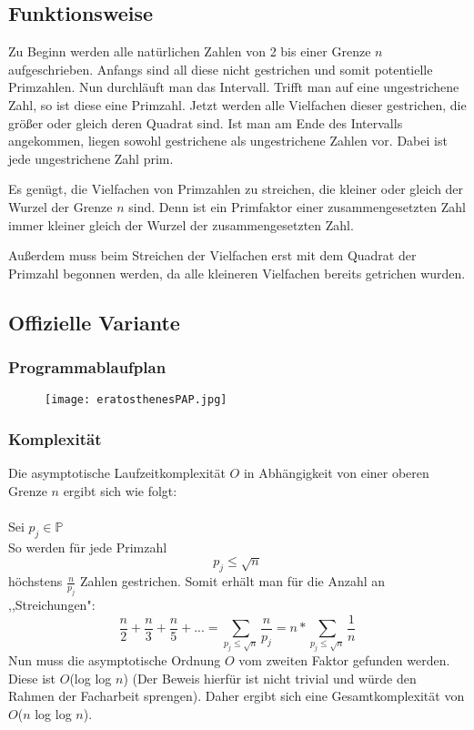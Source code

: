 \documentclass[a4paper,12pt]{article}
\begin{document}
\subsection{Funktionsweise}
Zu Beginn werden alle natürlichen Zahlen von 2 bis einer Grenze $n$ aufgeschrieben. Anfangs sind all diese nicht gestrichen und somit potentielle Primzahlen. Nun durchläuft man das Intervall. Trifft man auf eine ungestrichene Zahl, so ist diese eine Primzahl. Jetzt werden alle Vielfachen dieser gestrichen, die größer oder gleich deren Quadrat sind. Ist man am Ende des Intervalls angekommen, liegen sowohl gestrichene als ungestrichene Zahlen vor. Dabei ist jede ungestrichene Zahl prim.

Es genügt, die Vielfachen von Primzahlen zu streichen, die kleiner oder gleich der Wurzel der Grenze $n$ sind. Denn ist ein Primfaktor einer zusammengesetzten Zahl immer kleiner gleich der Wurzel der zusammengesetzten Zahl.

Außerdem muss beim Streichen der Vielfachen erst mit dem Quadrat der Primzahl begonnen werden, da alle kleineren Vielfachen bereits getrichen wurden.

\newpage{}

\subsection{Offizielle Variante}

\subsubsection{Programmablaufplan}
\begin{figure}[h]
\texttt{[image: eratosthenesPAP.jpg]}
\end{figure}

\subsubsection{Komplexität}
Die asymptotische Laufzeitkomplexität $O$ in Abhängigkeit von einer oberen Grenze $n$ ergibt sich wie folgt:\\\\
Sei $p_j \in \mathbb{P}$\\
So werden für jede Primzahl 
\[ p_j \leq \sqrt{n} \]
höchstens $\frac{n}{p_j}$ Zahlen gestrichen. Somit erhält man für die Anzahl an ,,Streichungen":\\
\[ \frac{n}{2} + \frac{n}{3} + \frac{n}{5} + ... = \sum_{p_j\leq\sqrt{n}}{\frac{n}{p_j}} = n * \sum_{p_j\leq\sqrt{n}}{\frac{1}{n}}\]
Nun muss die asymptotische Ordnung $O$ vom zweiten Faktor gefunden werden. Diese ist $O$(log log $n$) (Der Beweis hierfür ist nicht trivial und würde den Rahmen der Facharbeit sprengen). Daher ergibt sich eine Gesamtkomplexität von $O$($n$ log log $n$).
\end{document}
